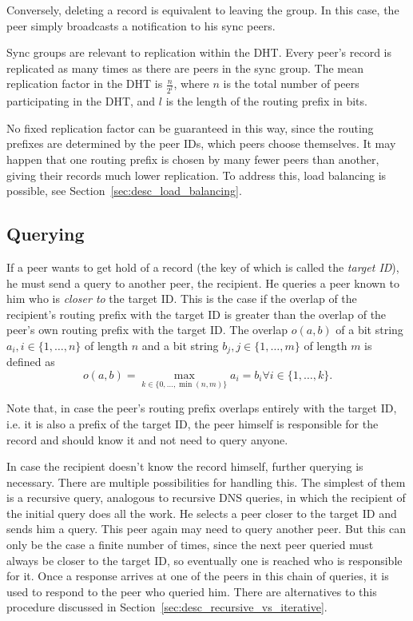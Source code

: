 Conversely, deleting a record is equivalent to leaving the group. In this case,
the peer simply broadcasts a notification to his sync peers.

Sync groups are relevant to replication within the DHT. Every peer's record is
replicated as many times as there are peers in the sync group. The mean
replication factor in the DHT is $\frac{n}{2^l}$, where $n$ is the total number
of peers participating in the DHT, and $l$ is the length of the routing prefix
in bits.

No fixed replication factor can be guaranteed in this way, since the routing
prefixes are determined by the peer IDs, which peers choose themselves. It may
happen that one routing prefix is chosen by many fewer peers than another,
giving their records much lower replication. To address this, load balancing is
possible, see Section~\ref{sec:desc_load_balancing}.

\subsection{Querying}
\label{sec:desc_querying}
If a peer wants to get hold of a record (the key of which is called the
\emph{target ID}), he must send a query to another peer, the recipient. He
queries a peer known to him who is \emph{closer to} the target ID. This is the
case if the overlap of the recipient's routing prefix with the target ID is
greater than the overlap of the peer's own routing prefix with the target ID.
The overlap $o(a, b)$ of a bit string $a_i, i \in \{1, \ldots, n\}$ of length
$n$ and a bit string $b_j, j \in \{1, \ldots, m\}$ of length $m$ is defined as
\[o(a, b) = \max_{k \in \{0, \ldots, \min(n, m)\}} a_i = b_i \forall i \in \{1,
\ldots, k\}.\]

Note that, in case the peer's routing prefix overlaps entirely with the target
ID, i.e. it is also a prefix of the target ID, the peer himself is responsible
for the record and should know it and not need to query anyone.

In case the recipient doesn't know the record himself, further querying is
necessary. There are multiple possibilities for handling this. The simplest of
them is a recursive query, analogous to recursive DNS queries, in which the
recipient of the initial query does all the work. He selects a peer closer to
the target ID and sends him a query. This peer again may need to query another
peer. But this can only be the case a finite number of times, since the next
peer queried must always be closer to the target ID, so eventually one is
reached who is responsible for it. Once a response arrives at one of the peers
in this chain of queries, it is used to respond to the peer who queried him.
There are alternatives to this procedure discussed in
Section~\ref{sec:desc_recursive_vs_iterative}.

